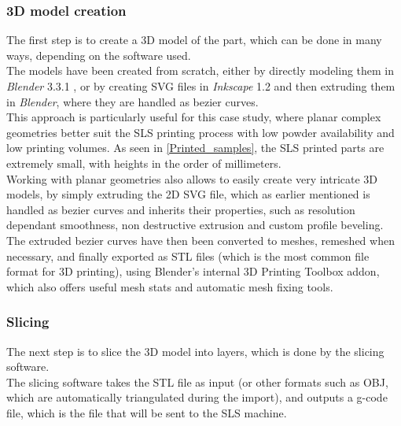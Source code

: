 \documentclass{article}
\begin{document}
        \subsubsection{3D model creation\label{3D_model_creation}}

        The first step is to create a 3D model of the part, which can be done in many ways, 
        depending on the software used. \\

        The models have been created from scratch, either by directly modeling them in \textit{Blender} 3.3.1 \autocites{Blender},
        or by creating SVG files in \textit{Inkscape} 1.2 \autocites{Inkscape} and then extruding them in \textit{Blender}, where
        they are handled as bezier curves. \\

        This approach is particularly useful for this case study, where planar complex geometries better suit the SLS printing process
        with low powder availability and low printing volumes. As seen in \ref{Printed_samples}, the SLS printed parts 
        are extremely small, with heights in the order of millimeters. \\
        
        Working with planar geometries also allows to easily create very intricate 3D models, by simply extruding the 2D SVG file, 
        which as earlier mentioned is handled as bezier curves and inherits their properties, such as resolution 
        dependant smoothness, non destructive extrusion and custom profile beveling. \\

        The extruded bezier curves have then been converted to meshes, remeshed when necessary, and finally 
        exported as STL files (which is the most common file format for 3D printing), using 
        Blender's internal 3D Printing Toolbox addon, which also offers useful mesh stats and 
        automatic mesh fixing tools. \\
        
        \subsubsection{Slicing\label{Slicing}}
        
        The next step is to slice the 3D model into layers, which is done by the slicing software. \\

        The slicing software takes the STL file as input (or other formats such as OBJ, which are
        automatically triangulated during the import), and outputs a g-code file, which is the file that will be sent to the SLS machine. \\
\end{document}
